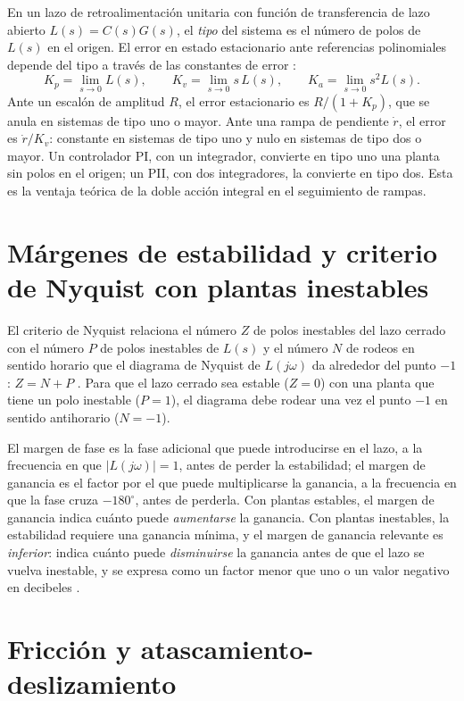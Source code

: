 En un lazo de retroalimentación unitaria con función de transferencia de lazo abierto $L(s)=C(s)G(s)$, el \emph{tipo} del sistema es el número de polos de $L(s)$ en el origen. El error en estado estacionario ante referencias polinomiales depende del tipo a través de las constantes de error \cite{ogata,gene}:
\begin{equation}
K_p=\lim_{s\to0}L(s), \qquad K_v=\lim_{s\to0}s\,L(s), \qquad K_a=\lim_{s\to0}s^2L(s).
\end{equation}
Ante un escalón de amplitud $R$, el error estacionario es $R/(1+K_p)$, que se anula en sistemas de tipo uno o mayor. Ante una rampa de pendiente $\dot r$, el error es $\dot r/K_v$: constante en sistemas de tipo uno y nulo en sistemas de tipo dos o mayor. Un controlador PI, con un integrador, convierte en tipo uno una planta sin polos en el origen; un PII, con dos integradores, la convierte en tipo dos. Esta es la ventaja teórica de la doble acción integral en el seguimiento de rampas.

\section{Márgenes de estabilidad y criterio de Nyquist con plantas inestables}

El criterio de Nyquist relaciona el número $Z$ de polos inestables del lazo cerrado con el número $P$ de polos inestables de $L(s)$ y el número $N$ de rodeos en sentido horario que el diagrama de Nyquist de $L(j\omega)$ da alrededor del punto $-1$: $Z=N+P$ \cite{gene}. Para que el lazo cerrado sea estable ($Z=0$) con una planta que tiene un polo inestable ($P=1$), el diagrama debe rodear una vez el punto $-1$ en sentido antihorario ($N=-1$).

El margen de fase es la fase adicional que puede introducirse en el lazo, a la frecuencia en que $|L(j\omega)|=1$, antes de perder la estabilidad; el margen de ganancia es el factor por el que puede multiplicarse la ganancia, a la frecuencia en que la fase cruza $-180^\circ$, antes de perderla. Con plantas estables, el margen de ganancia indica cuánto puede \emph{aumentarse} la ganancia. Con plantas inestables, la estabilidad requiere una ganancia mínima, y el margen de ganancia relevante es \emph{inferior}: indica cuánto puede \emph{disminuirse} la ganancia antes de que el lazo se vuelva inestable, y se expresa como un factor menor que uno o un valor negativo en decibeles \cite{gene}.

\section{Fricción y atascamiento-deslizamiento}

